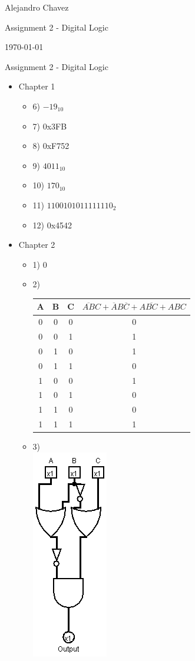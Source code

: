 \documentclass{article}
\begin{document}
\hfill Alejandro Chavez

\hfill Assignment 2 - Digital Logic

\hfill \today\\

\begin{center}\begin{large}Assignment 2 - Digital Logic\end{large}\end{center}\begin{itemize}
	\item
	Chapter 1
	\begin{itemize}
		\item 6)
    $-19_{10}$
		\item 7)
		0x3FB
		\item 8)
		0xF752
		\item 9)
		$4011_{10}$
		\item 10)
		$170_{10}$
		\item 11)
		$1100101011111110_{2}$
		\item 12)
		0x4542
	\end{itemize}
	\item
	Chapter 2
	\begin{itemize}
		\item 1)
		$0$
		\item 2)\\
		\begin{tabular}{|c|c|c||c|}
      \hline
      A & B & C & $\overline{AB}C+\overline{A}B\overline{C}+A\overline{BC}+ABC$ \\ \hline
      0 & 0 & 0 & 0 \\
      0 & 0 & 1 & 1 \\
      0 & 1 & 0 & 1 \\
      0 & 1 & 1 & 0 \\
      1 & 0 & 0 & 1 \\
      1 & 0 & 1 & 0 \\
      1 & 1 & 0 & 0 \\
      1 & 1 & 1 & 1 \\ \hline
		\end{tabular}
    \item 3)\\
    \includegraphics[scale=0.5]{chapter2problem3.png}

\end{itemize}
\end{itemize}
\end{document}
